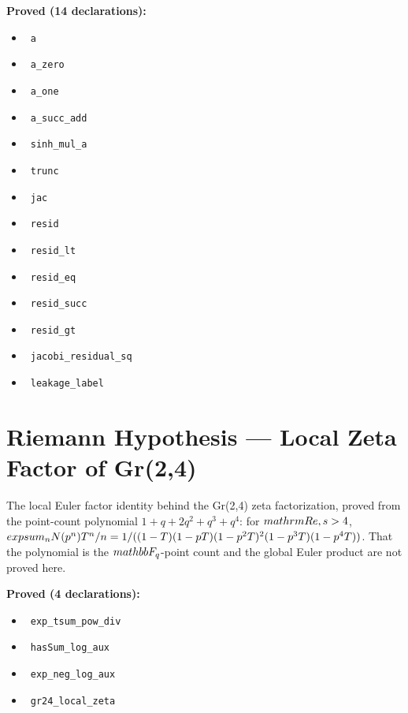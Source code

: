 \documentclass{report}
\theoremstyle{definition}
\begin{document}
\noindent\textbf{Proved (14 declarations):}
\begin{itemize}
  \item {}\leanok\ \texttt{a}
  \item {}\leanok\ \texttt{a\_zero}
  \item {}\leanok\ \texttt{a\_one}
  \item {}\leanok\ \texttt{a\_succ\_add}
  \item {}\leanok\ \texttt{sinh\_mul\_a}
  \item {}\leanok\ \texttt{trunc}
  \item {}\leanok\ \texttt{jac}
  \item {}\leanok\ \texttt{resid}
  \item {}\leanok\ \texttt{resid\_lt}
  \item {}\leanok\ \texttt{resid\_eq}
  \item {}\leanok\ \texttt{resid\_succ}
  \item {}\leanok\ \texttt{resid\_gt}
  \item {}\leanok\ \texttt{jacobi\_residual\_sq}
  \item {}\leanok\ \texttt{leakage\_label}
\end{itemize}

\section{Riemann Hypothesis --- Local Zeta Factor of Gr(2,4)}
The local Euler factor identity behind the Gr(2,4) zeta factorization, proved from the point-count polynomial $1+q+2q^2+q^3+q^4$: for $\\mathrm{Re}\\,s>4$, $\\exp\\sum_n N(p^n)T^n/n = 1/((1-T)(1-pT)(1-p^2T)^2(1-p^3T)(1-p^4T))$. That the polynomial is the $\\mathbb{F}_q$-point count and the global Euler product are not proved here.

\noindent\textbf{Proved (4 declarations):}
\begin{itemize}
  \item {}\leanok\ \texttt{exp\_tsum\_pow\_div}
  \item {}\leanok\ \texttt{hasSum\_log\_aux}
  \item {}\leanok\ \texttt{exp\_neg\_log\_aux}
  \item {}\leanok\ \texttt{gr24\_local\_zeta}
\end{itemize}
\end{document}
